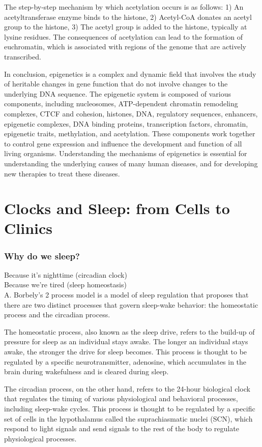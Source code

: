 \begin{itemize}
\begin{itemize}
The step-by-step mechanism by which acetylation occurs is as follows: 1) An acetyltransferase enzyme binds to the histone, 2) Acetyl-CoA donates an acetyl group to the histone, 3) The acetyl group is added to the histone, typically at lysine residues. The consequences of acetylation can lead to the formation of euchromatin, which is associated with regions of the genome that are actively transcribed.

In conclusion, epigenetics is a complex and dynamic field that involves the study of heritable changes in gene function that do not involve changes to the underlying DNA sequence. The epigenetic system is composed of various components, including nucleosomes, ATP-dependent chromatin remodeling complexes, CTCF and cohesion, histones, DNA, regulatory sequences, enhancers, epigenetic complexes, DNA binding proteins, transcription factors, chromatin, epigenetic traits, methylation, and acetylation. These components work together to control gene expression and influence the development and function of all living organisms. Understanding the mechanisms of epigenetics is essential for understanding the underlying causes of many human diseases, and for developing new therapies to treat these diseases.
\section{Clocks and Sleep: from Cells to Clinics}

\subsubsection{Why do we sleep?}
Because it's nighttime (circadian clock)
\\Because we're tired (sleep homeostasis)
\\A. Borbely's 2 process model is a model of sleep regulation that proposes that there are two distinct processes that govern sleep-wake behavior: the homeostatic process and the circadian process.

The homeostatic process, also known as the sleep drive, refers to the build-up of pressure for sleep as an individual stays awake. The longer an individual stays awake, the stronger the drive for sleep becomes. This process is thought to be regulated by a specific neurotransmitter, adenosine, which accumulates in the brain during wakefulness and is cleared during sleep.

The circadian process, on the other hand, refers to the 24-hour biological clock that regulates the timing of various physiological and behavioral processes, including sleep-wake cycles. This process is thought to be regulated by a specific set of cells in the hypothalamus called the suprachiasmatic nuclei (SCN), which respond to light signals and send signals to the rest of the body to regulate physiological processes.


\end{itemize}
\end{itemize}
